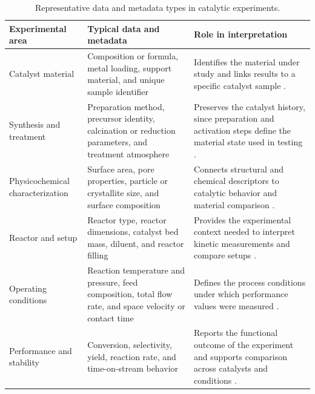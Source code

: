 \begin{table}[H]
    \centering
    \caption{Representative data and metadata types in catalytic experiments.}
    \label{tab:catalytic-data-landscape}
    \small
    \renewcommand{\arraystretch}{1.2}
    \begin{tabularx}{\textwidth}{p{}p{}X}
        \toprule
        Experimental area & Typical data and metadata & Role in interpretation \\
        \midrule
        Catalyst material & Composition or formula, metal loading, support material, and unique sample identifier & Identifies the material under study and links results to a specific catalyst sample \cite{schumann2025nomad,salim2026methane}. \\
        Synthesis and treatment & Preparation method, precursor identity, calcination or reduction parameters, and treatment atmosphere & Preserves the catalyst history, since preparation and activation steps define the material state used in testing \cite{mendes2025data,salim2026methane}. \\
        Physicochemical characterization & Surface area, pore properties, particle or crystallite size, and surface composition & Connects structural and chemical descriptors to catalytic behavior and material comparison \cite{schumann2025nomad,salim2026methane}. \\
        Reactor and setup & Reactor type, reactor dimensions, catalyst bed mass, diluent, and reactor filling & Provides the experimental context needed to interpret kinetic measurements and compare setups \cite{wulf2021unified,schumann2025nomad}. \\
        Operating conditions & Reaction temperature and pressure, feed composition, total flow rate, and space velocity or contact time & Defines the process conditions under which performance values were measured \cite{schumann2025nomad,salim2026methane}. \\
        Performance and stability & Conversion, selectivity, yield, reaction rate, and time-on-stream behavior & Reports the functional outcome of the experiment and supports comparison across catalysts and conditions \cite{schumann2025nomad,salim2026methane}. \\
        \bottomrule
    \end{tabularx}
\end{table}
